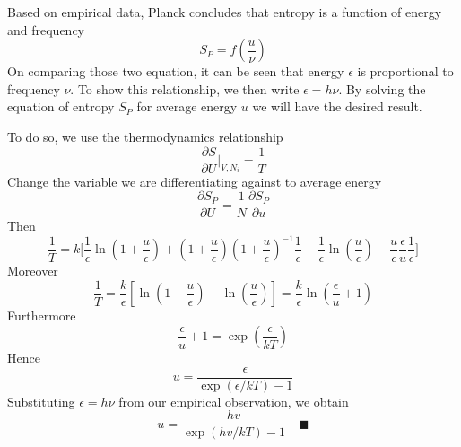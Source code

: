 \documentclass[../../../Main.tex]{subfiles}
\begin{document}
Based on empirical data, Planck concludes that entropy is a function of energy and frequency
\begin{equation*}
    S_P=f\left(\frac{u}{\nu}\right)
\end{equation*}
On comparing those two equation, it can be seen that energy $\epsilon$ is proportional to frequency $\nu$. To show this relationship, we then write $\epsilon=h\nu$. By solving the equation of entropy $S_P$ for average energy $u$ we will have the desired result.

To do so, we use the thermodynamics relationship
\begin{equation*}
    \frac{\partial S}{\partial U}\bigg|_{V, N_i}=\frac{1}{T}
\end{equation*}
Change the variable we are differentiating against to average energy 
\begin{equation*}
    \frac{\partial S_P}{\partial U}=\frac{1}{N}\frac{\partial S_P}{\partial u}
\end{equation*}
Then 
\begin{equation*}
    \frac{1}{T}=k\bigg[ \frac{1}{\epsilon}\ln\left(1+\frac{u}{\epsilon}\right) +\left(1+\frac{u}{\epsilon}\right) \left(1+\frac{u}{\epsilon}\right)^{-1 }\frac{1}{\epsilon} -\frac{1}{\epsilon}\ln\left(\frac{u}{\epsilon}\right) -\frac{u}{\epsilon}\frac{\epsilon}{u}\frac{1}{\epsilon}\bigg]
\end{equation*}
Moreover
\begin{equation*}
    \frac{1}{T}=\frac{k}{\epsilon}\left[\ln\left(1+\frac{u}{\epsilon}\right)-\ln \left(\frac{u}{\epsilon}\right)\right]=\frac{k}{\epsilon}\ln \left(\frac{\epsilon}{u}+1\right)
\end{equation*}
Furthermore
\begin{equation*}
    \frac{\epsilon}{u}+1=\exp \left(\frac{\epsilon}{kT}\right)
\end{equation*}
Hence
\begin{equation*}
    u=\frac{\epsilon}{\exp(\epsilon/k T)-1}
\end{equation*}
Substituting $\epsilon=h\nu$ from our empirical observation, we obtain
\begin{equation*}
    u=\frac{hv}{\exp(hv/k T)-1}\quad\blacksquare
\end{equation*}
\end{document}
